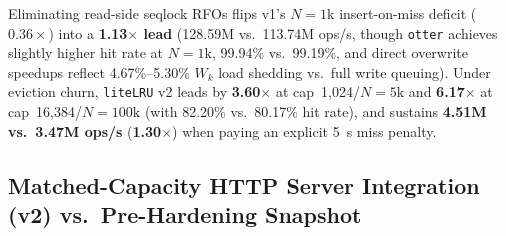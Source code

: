 \documentclass[11pt,a4paper]{article}
\begin{document}
\begin{table}[h]
\centering
{}
\caption{Write-heavy direct overwrite contention, immutable insert-on-miss controls, and $5\,\mu\text{s}$ backend miss-penalty benchmark (10-run medians).}
\end{table}

Eliminating read-side seqlock RFOs flips v1's $N=1\text{k}$ insert-on-miss deficit ($0.36\times$) into a \textbf{1.13$\times$ lead} (128.59M vs.\ 113.74M ops/s, though \texttt{otter} achieves slightly higher hit rate at $N=1\text{k}$, 99.94\% vs.\ 99.19\%, and direct overwrite speedups reflect 4.67\%--5.30\% $W_k$ load shedding vs.\ full write queuing). Under eviction churn, \texttt{liteLRU} v2 leads by \textbf{3.60$\times$} at cap~1,024/$N=5\text{k}$ and \textbf{6.17$\times$} at cap~16,384/$N=100\text{k}$ (with 82.20\% vs.\ 80.17\% hit rate), and sustains \textbf{4.51M vs.\ 3.47M ops/s} (\textbf{1.30$\times$}) when paying an explicit 5~\textmu s miss penalty.

\subsection{Matched-Capacity HTTP Server Integration (v2) vs.\ Pre-Hardening Snapshot}
\end{document}
